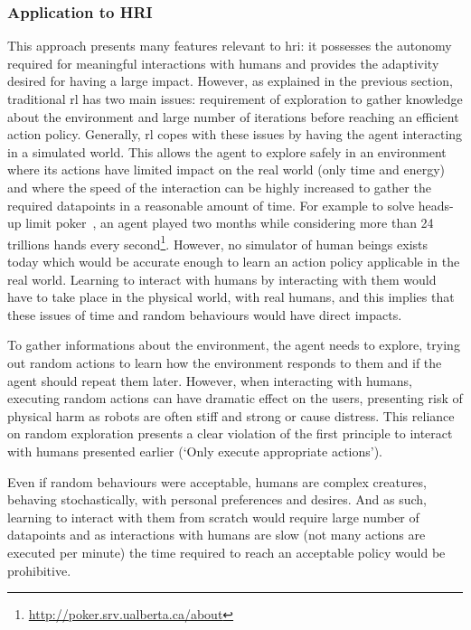 	\subsubsection{Application to HRI}
	
	This approach presents many features relevant to \gls{hri}: it possesses the autonomy required for meaningful interactions with humans and provides the adaptivity desired for having a large impact. However, as explained in the previous section, traditional \gls{rl} has two main issues: requirement of exploration to gather knowledge about the environment and large number of iterations before reaching an efficient action policy. Generally, \gls{rl} copes with these issues by having the agent interacting in a simulated world. This allows the agent to explore safely in an environment where its actions have limited impact on the real world (only time and energy) and where the speed of the interaction can be highly increased to gather the required datapoints in a reasonable amount of time. For example to solve heads-up limit poker~\citep{bowling2015heads}, an agent played two months while considering more than 24 trillions hands every second\footnote{\url{http://poker.srv.ualberta.ca/about}}. However, no simulator of human beings exists today which would be accurate enough to learn an action policy applicable in the real world. Learning to interact with humans by interacting with them would have to take place in the physical world, with real humans, and this implies that these issues of time and random behaviours would have direct impacts. 
	
	To gather informations about the environment, the agent needs to explore, trying out random actions to learn how the environment responds to them and if the agent should repeat them later. However, when interacting with humans, executing random actions can have dramatic effect on the users, presenting risk of physical harm as robots are often stiff and strong or cause distress. This reliance on random exploration presents a clear violation of the first principle to interact with humans presented earlier (`Only execute appropriate actions').
	
	Even if random behaviours were acceptable, humans are complex creatures, behaving stochastically, with personal preferences and desires. And as such, learning to interact with them from scratch would require large number of datapoints and as interactions with humans are slow (not many actions are executed per minute) the time required to reach an acceptable policy would be prohibitive. 
	
